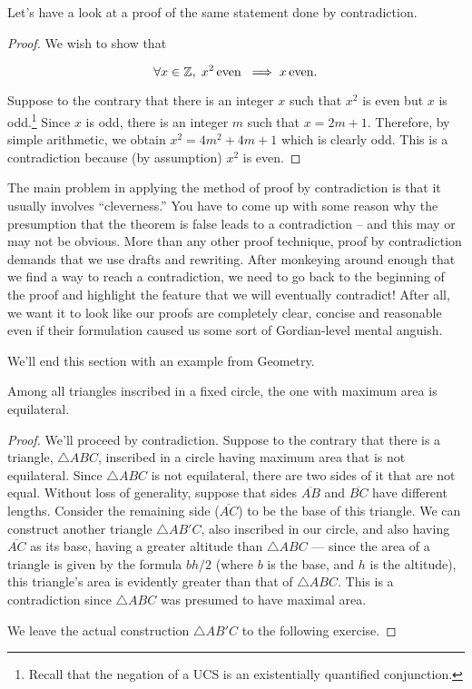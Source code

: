 Let's have a look at a proof of the same statement done by contradiction.

\begin{proof}
We wish to show that 

\[ \forall x \in {\mathbb Z}, \; x^2 \, \mbox{even} \; 
\implies x \, \mbox{even}. 
\]

Suppose to the contrary that there is an integer $x$ such that 
$x^2$ is even but $x$ is odd.\footnote{Recall that the negation of 
a UCS is an existentially quantified conjunction.}  Since $x$ is
odd, there is an integer $m$ such that $x=2m+1$.  Therefore, by
simple arithmetic, we obtain $x^2 = 4m^2+4m+1$ which is clearly odd.
This is a contradiction because (by assumption) $x^2$ is even. 

\end{proof}

The main problem in applying the method of proof by contradiction
is that it usually involves ``cleverness.''   You have to come up
with some reason why the presumption that the theorem is false leads
to a contradiction -- and this may or may not be obvious.  More than
any other proof technique, proof by contradiction demands that we use
drafts and rewriting.  After monkeying around enough that we find a 
way to reach a contradiction, we need to go back to the beginning
of the proof and highlight the feature that we will eventually contradict!
After all, we want it to look like our proofs are completely clear, concise
and reasonable even if their formulation caused us some sort
of Gordian-level mental anguish. 

We'll end this section with an example from Geometry.

\begin{thm}
Among all triangles inscribed in a fixed circle, the one with maximum
area is equilateral.
\end{thm}

\begin{proof} 
We'll proceed by contradiction.  Suppose to the contrary that there is a 
triangle, $\triangle ABC$, inscribed in a circle having maximum area that 
is not equilateral.  Since $\triangle ABC$ is not equilateral, there are 
two sides of it that are not equal.  Without loss of generality, suppose that
sides $\overline{AB}$ and $\overline{BC}$ have different lengths.   Consider
the remaining side ($\overline{AC}$) to be the base of this triangle.
We can construct another triangle $\triangle AB'C$, also inscribed in our circle, and also 
having $\overline{AC}$ as its base, having a greater altitude than
$\triangle ABC$ --- since the area of a triangle is given by
the formula $bh/2$ (where $b$ is the base, and $h$ is the altitude), 
this triangle's area is evidently greater than that of $\triangle ABC$.
This is a contradiction since $\triangle ABC$ was presumed to have 
maximal area.

We leave the actual construction $\triangle AB'C$ to the following exercise.
\end{proof}

